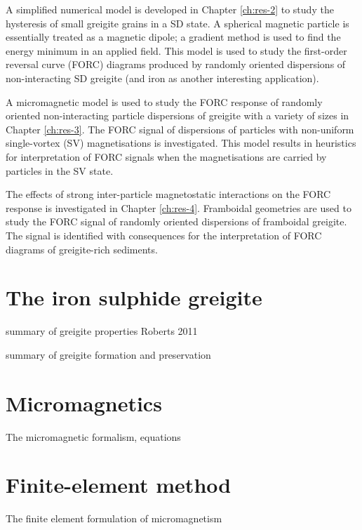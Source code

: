 A simplified numerical model is developed in Chapter \ref{ch:res-2} to study the hysteresis of small greigite grains in a SD state. A spherical magnetic particle is essentially treated as a magnetic dipole; a gradient method is used to find the energy minimum in an applied field. This model is used to study the first-order reversal curve (FORC) diagrams produced by randomly oriented dispersions of non-interacting SD greigite (and iron as another interesting application).\par

A micromagnetic model is used to study the FORC response of randomly oriented non-interacting particle dispersions of greigite with a variety of sizes in Chapter \ref{ch:res-3}. The FORC signal of dispersions of particles with non-uniform single-vortex (SV) magnetisations is investigated. This model results in heuristics for interpretation of FORC signals when the magnetisations are carried by particles in the SV state.\par

The effects of strong inter-particle magnetostatic interactions on the FORC response is investigated in Chapter \ref{ch:res-4}. Framboidal geometries are used to study the FORC signal of randomly oriented dispersions of framboidal greigite. The signal is identified with consequences for the interpretation of FORC diagrams of greigite-rich sediments.\par

\section{The iron sulphide greigite}
summary of greigite properties Roberts 2011

summary of greigite formation and preservation

\section{Micromagnetics}
The micromagnetic formalism, equations

\section{Finite-element method}
The finite element formulation of micromagnetism

\renewcommand\bibname{{References}}



